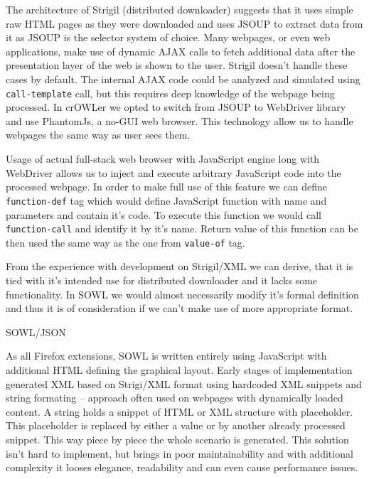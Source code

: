 The architecture of Strigil (distributed downloader) suggests that it uses
simple raw HTML pages as they were downloaded and uses JSOUP to extract data
from it as JSOUP is the selector system of choice. Many webpages, or even web
applications, make use of dynamic AJAX calls to fetch additional data after the
presentation layer of the web is shown to the user. Strigil doesn't handle
these cases by default. The internal AJAX code could be analyzed and simulated
using {\tt call-template} call, but this requires deep knowledge of the webpage
being processed. In crOWLer we opted to switch from JSOUP to WebDriver library
and use PhantomJs, a no-GUI web browser. This technology allow us to handle
webpages the same way as user sees them. 

Usage of actual full-stack web browser with JavaScript engine long with
WebDriver allows us to inject and execute arbitrary JavaScript code into the
processed webpage. In order to make full use of this feature we can define {\tt
function-def} tag which would define JavaScript function with name and
parameters and contain it's code. To execute this function we would call {\tt
function-call} and identify it by it's name. Return value of this function can
be then used the same way as the one from {\tt value-of} tag. 

From the experience with development on Strigil/XML we can derive, that it is
tied with it's intended use for distributed downloader and it lacks some
functionality. In SOWL we would almost necessarily modify it's formal definition
and thus it is of consideration if we can't make use of more appropriate
format. 


\secc SOWL/JSON

As all Firefox extensions, SOWL is written entirely using JavaScript with
additional HTML defining the graphical layout. Early stages of implementation
generated XML based on Strigi/XML format using hardcoded XML snippets and
string formating -- approach often used on webpages with dynamically loaded
content. A string holds a snippet of HTML or XML structure with placeholder.
This placeholder is replaced by either a value or by another already processed
snippet. This way piece by piece the whole scenario is generated. This solution
isn't hard to implement, but brings in poor maintainability and with additional
complexity it looses elegance, readability and can even cause performance
issues. 

